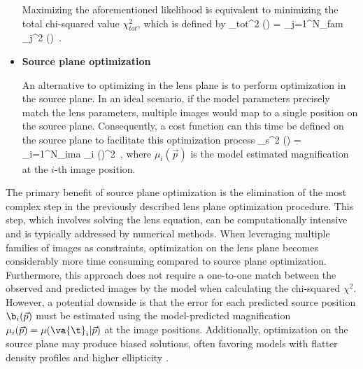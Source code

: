 \begin{itemize}
    Maximizing the aforementioned likelihood is equivalent to minimizing the total chi-squared value $\chi_{tot}^2$, which is defined by
    \be
    \label{eq:4.25}
    \chi_{tot}^2 () = \sum\limits_{j=1}^{N_{fam}} \chi_j^2 () \,.
    \ee
    \clearpage
    \item \textbf{Source plane optimization}

    An alternative to optimizing in the lens plane is to perform optimization in the source plane. In an ideal scenario, if the model parameters precisely match the lens parameters, multiple images would map to a single position on the source plane. Consequently, a cost function can this time be defined on the source plane to facilitate this optimization process
    \be
    \label{eq:4.26}
    \chi_s^2 () = \sum\limits_{i=1}^{N_{ima}}  \mu_i ()^2 \,,
    \ee
    where $\mu_i (\vec{p})$ is the model estimated magnification at the $i$-th image position.
\end{itemize}


The primary benefit of source plane optimization is the elimination of the most complex step in the previously described lens plane optimization procedure. This step, which involves solving the lens equation, can be computationally intensive and is typically addressed by numerical methods. When leveraging multiple families of images as constraints, optimization on the lens plane becomes considerably more time consuming compared to source plane optimization. Furthermore, this approach does not require a one-to-one match between the observed and predicted images by the model when calculating the chi-squared $\chi^2$. However, a potential downside is that the error for each predicted source position $\b_i (\vec{p})$ must be estimated using the model-predicted magnification $\mu_i (\vec{p}) = \mu (\va{\t}_i | \vec{p})$ at the image positions. Additionally, optimization on the source plane may produce biased solutions, often favoring models with flatter density profiles and higher ellipticity \citep{kneib_cluster_2011}.
